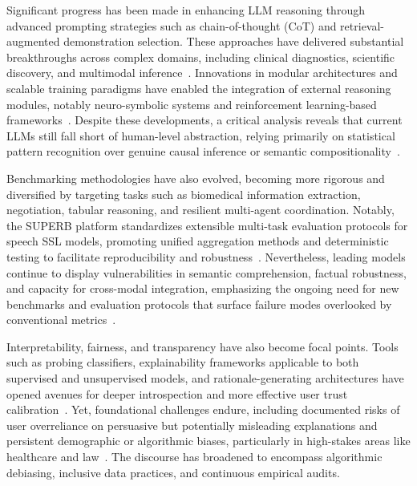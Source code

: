 \documentclass[sigconf]{acmart}
\begin{document}
Significant progress has been made in enhancing LLM reasoning through advanced prompting strategies such as chain-of-thought (CoT) and retrieval-augmented demonstration selection. These approaches have delivered substantial breakthroughs across complex domains, including clinical diagnostics, scientific discovery, and multimodal inference~\cite{ref23,ref38,ref47,ref58,ref61,ref78,ref86,ref87,ref89}. Innovations in modular architectures and scalable training paradigms have enabled the integration of external reasoning modules, notably neuro-symbolic systems and reinforcement learning-based frameworks~\cite{ref49,ref52,ref57,ref86,ref87,ref89}. Despite these developments, a critical analysis reveals that current LLMs still fall short of human-level abstraction, relying primarily on statistical pattern recognition over genuine causal inference or semantic compositionality~\cite{ref23,ref49,ref57}.

Benchmarking methodologies have also evolved, becoming more rigorous and diversified by targeting tasks such as biomedical information extraction, negotiation, tabular reasoning, and resilient multi-agent coordination. Notably, the SUPERB platform standardizes extensible multi-task evaluation protocols for speech SSL models, promoting unified aggregation methods and deterministic testing to facilitate reproducibility and robustness~\cite{ref101}. Nevertheless, leading models continue to display vulnerabilities in semantic comprehension, factual robustness, and capacity for cross-modal integration, emphasizing the ongoing need for new benchmarks and evaluation protocols that surface failure modes overlooked by conventional metrics~\cite{ref13,ref38,ref47,ref56,ref66,ref67,ref101}.

Interpretability, fairness, and transparency have also become focal points. Tools such as probing classifiers, explainability frameworks applicable to both supervised and unsupervised models, and rationale-generating architectures have opened avenues for deeper introspection and more effective user trust calibration~\cite{ref31,ref32,ref36,ref48,ref50,ref51,ref54,ref55}. Yet, foundational challenges endure, including documented risks of user overreliance on persuasive but potentially misleading explanations and persistent demographic or algorithmic biases, particularly in high-stakes areas like healthcare and law~\cite{ref31,ref33,ref36,ref39,ref45,ref53}. The discourse has broadened to encompass algorithmic debiasing, inclusive data practices, and continuous empirical audits.
\end{document}
